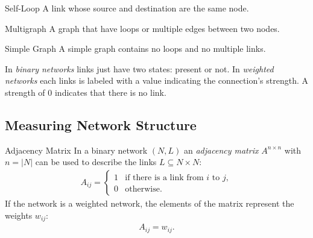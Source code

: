 \documentclass[english]{panikzettel}
\begin{document}
\begin{thirdboxl}
	\begin{defi}{Self-Loop}
		A link whose source and destination are the same node.

		\centering
	\end{defi}
\end{thirdboxl}%
\begin{thirdboxm}
	\begin{defi}{Multigraph}
		A graph that have loops or multiple edges between two nodes.

		\centering
	\end{defi}
\end{thirdboxm}%
\begin{thirdboxr}
	\begin{defi}{Simple Graph}
		A simple graph contains no loops and no multiple links.

		\centering
	\end{defi}
\end{thirdboxr}%

In \textit{binary networks} links just have two states: present or not.
In \textit{weighted networks} each links is labeled with a value indicating the connection's strength.
A strength of $ 0 $ indicates that there is no link.

\subsection{Measuring Network Structure}
\begin{defi}{Adjacency Matrix}
	In a binary network $ (N,L) $ an \textit{adjacency matrix} $ A^{n \times n} $ with $ n = |N| $ can be used to describe the links $ L \subseteq N \times N $:
	\begin{align*}
		A_{ij} = \begin{cases}
		1 & \text{if there is a link from } i \text{ to } j, \\
		0 & \text{otherwise.}
		\end{cases}
	\end{align*}
	If the network is a weighted network, the elements of the matrix represent the weights $ w_{ij} $:
	\begin{align*}
		A_{ij} = w_{ij}.
	\end{align*}
\end{defi}
\end{document}
